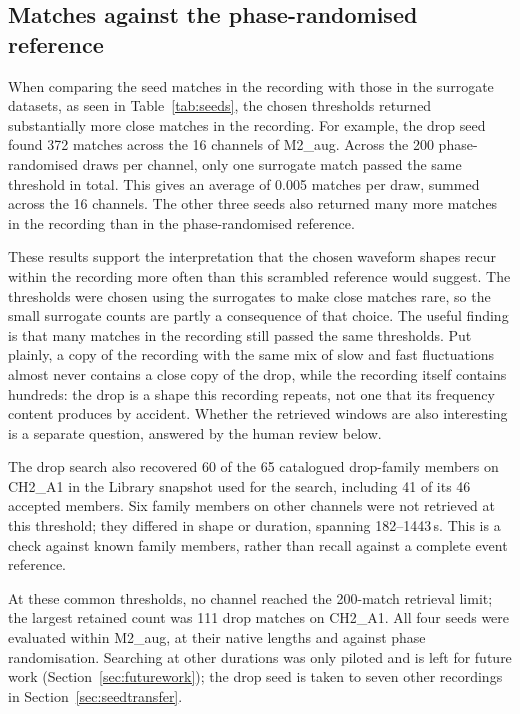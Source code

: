 \subsection{Matches against the phase-randomised reference}
\label{sec:seednullresults}

When comparing the seed matches in the recording with those in the surrogate datasets, as seen in Table~\ref{tab:seeds}, the chosen thresholds returned substantially more close matches in the recording. For example, the drop seed found 372 matches across the 16 channels of M2\_aug. Across the 200 phase-randomised draws per channel, only one surrogate match passed the same threshold in total. This gives an average of 0.005 matches per draw, summed across the 16 channels. The other three seeds also returned many more matches in the recording than in the phase-randomised reference.

These results support the interpretation that the chosen waveform shapes recur within the recording more often than this scrambled reference would suggest. The thresholds were chosen using the surrogates to make close matches rare, so the small surrogate counts are partly a consequence of that choice. The useful finding is that many matches in the recording still passed the same thresholds. Put plainly, a copy of the recording with the same mix of slow and fast fluctuations almost never contains a close copy of the drop, while the recording itself contains hundreds: the drop is a shape this recording repeats, not one that its frequency content produces by accident. Whether the retrieved windows are also interesting is a separate question, answered by the human review below.

The drop search also recovered 60 of the 65 catalogued drop-family members on CH2\_A1 in the Library snapshot used for the search, including 41 of its 46 accepted members. Six family members on other channels were not retrieved at this threshold; they differed in shape or duration, spanning 182--1443\,s. This is a check against known family members, rather than recall against a complete event reference.

At these common thresholds, no channel reached the 200-match retrieval limit; the largest retained count was 111 drop matches on CH2\_A1. All four seeds were evaluated within M2\_aug, at their native lengths and against phase randomisation. Searching at other durations was only piloted and is left for future work (Section~\ref{sec:futurework}); the drop seed is taken to seven other recordings in Section~\ref{sec:seedtransfer}.

